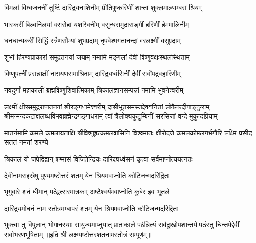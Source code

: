 \twolineshloka
{विमलां विश्वजननीं तुष्टिं दारिद्र्यनाशिनीम्}
{प्रीतिपुष्करिणीं शान्तां शुक्लमाल्याम्बरां श्रियम्}

\twolineshloka
{भास्करीं बिल्वनिलयां वरारोहां यशस्विनीम्}
{वसुन्धरामुदाराङ्गीं हरिणीं हेममालिनीम्}

\twolineshloka
{धनधान्यकरीं सिद्धिं स्त्रैणसौम्यां शुभप्रदाम्}
{नृपवेश्मगतानन्दां वरलक्ष्मीं वसुप्रदाम्}

\twolineshloka
{शुभां हिरण्यप्राकारां समुद्रतनयां जयाम्}
{नमामि मङ्गलां देवीं विष्णुवक्षःस्थलस्थिताम्}

\twolineshloka
{विष्णुपत्नीं प्रसन्नाक्षीं नारायणसमाश्रिताम्}
{दारिद्र्यध्वंसिनीं देवीं सर्वोपद्रवहारिणीम्}

\twolineshloka
{नवदुर्गां महाकालीं ब्रह्मविष्णुशिवात्मिकाम्}
{त्रिकालज्ञानसम्पन्नां नमामि भुवनेश्वरीम्}

\fourlineindentedshloka
{लक्ष्मीं क्षीरसमुद्रराजतनयां श्रीरङ्गधामेश्वरीम्}
{दासीभूतसमस्तदेववनितां लोकैकदीपाङ्कुराम्}
{श्रीमन्मन्दकटाक्षलब्धविभवब्रह्मेन्द्रगङ्गाधराम्}
{त्वां त्रैलोक्यकुटुम्बिनीं सरसिजां वन्दे मुकुन्दप्रियाम्}

\fourlineindentedshloka
{मातर्नमामि कमले कमलायताक्षि}
{श्रीविष्णुहृत्कमलवासिनि विश्वमातः}
{क्षीरोदजे कमलकोमलगर्भगौरि}
{लक्ष्मि प्रसीद सततं नमतां शरण्ये}

\twolineshloka
{त्रिकालं यो जपेद्विद्वान् षण्मासं विजितेन्द्रियः}
{दारिद्र्यध्वंसनं कृत्वा सर्वमाप्नोत्ययत्नतः}

\twolineshloka
{देवीनामसहस्रेषु पुण्यमष्टोत्तरं शतम्}
{येन श्रियमवाप्नोति कोटिजन्मदरिद्रितः}

\twolineshloka
{भृगुवारे शतं धीमान् पठेद्वत्सरमात्रकम्}
{अष्टैश्वर्यमवाप्नोति कुबेर इव भूतले}

\twolineshloka
{दारिद्र्यमोचनं नाम स्तोत्रमम्बापरं शतम्}
{येन श्रियमवाप्नोति कोटिजन्मदरिद्रितः}

\threelineshloka
{भुक्त्वा तु विपुलान् भोगानस्याः सायुज्यमाप्नुयात्}
{प्रातःकाले पठेन्नित्यं सर्वदुःखोपशान्तये}
{पठंस्तु चिन्तयेद्देवीं सर्वाभरणभूषिताम्}
॥इति श्री लक्ष्म्यष्टोत्तरशतनामस्तोत्रं सम्पूर्णम्॥